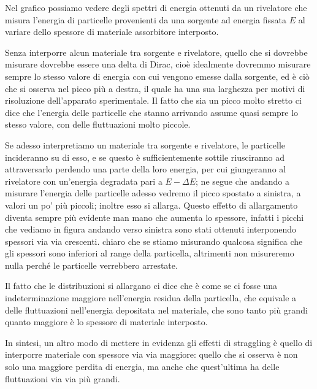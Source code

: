 Nel grafico possiamo vedere degli spettri di energia ottenuti da un rivelatore che misura l'energia di particelle provenienti da una sorgente ad energia fissata $E$ al variare dello spessore di materiale assorbitore interposto.

Senza interporre alcun materiale tra sorgente e rivelatore, quello che si dovrebbe misurare dovrebbe essere una delta di Dirac, cioè idealmente dovremmo misurare sempre lo stesso valore di energia con cui vengono emesse dalla sorgente, ed è ciò che si osserva nel picco più a destra, il quale ha una sua larghezza per motivi di risoluzione dell'apparato sperimentale. Il fatto che sia un picco molto stretto ci dice che l'energia delle particelle che stanno arrivando assume quasi sempre lo stesso valore, con delle fluttuazioni molto piccole.

Se adesso interpretiamo un materiale tra sorgente e rivelatore, le particelle incideranno su di esso, e se questo è sufficientemente sottile riusciranno ad attraversarlo perdendo una parte della loro energia, per cui giungeranno al rivelatore con un'energia degradata pari a $E - \Delta E$; ne segue che andando a misurare l'energia delle particelle adesso vedremo il picco spostato a sinistra, a valori un po' più piccoli; inoltre esso si allarga. Questo effetto di allargamento diventa sempre più evidente man mano che aumenta lo spessore, infatti i picchi che vediamo in figura andando verso sinistra sono stati ottenuti interponendo spessori via via crescenti. \E chiaro che se stiamo misurando qualcosa significa che gli spessori sono inferiori al range della particella, altrimenti non misureremo nulla perché le particelle verrebbero arrestate.

Il fatto che le distribuzioni si allargano ci dice che è come se ci fosse una indeterminazione maggiore nell'energia residua della particella, che equivale a delle fluttuazioni nell'energia depositata nel materiale, che sono tanto più grandi quanto maggiore è lo spessore di materiale interposto. 

In sintesi, un altro modo di mettere in evidenza gli effetti di straggling è quello di interporre materiale con spessore via via maggiore: quello che si osserva è non solo una maggiore perdita di energia, ma anche che quest'ultima ha delle fluttuazioni via via più grandi.


